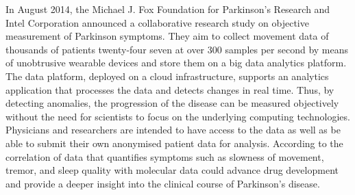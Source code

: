 In August 2014, the Michael J. Fox Foundation for Parkinson’s Research and Intel Corporation \cite{Intel_2013} announced a collaborative research study on objective measurement of Parkinson symptoms. They aim to collect movement data of thousands of patients twenty-four seven at over 300 samples per second by means of unobtrusive wearable devices and store them on a big data analytics platform. The data platform, deployed on a cloud infrastructure, supports an analytics application that processes the data and detects changes in real time. Thus, by detecting anomalies, the progression of the disease can be measured objectively without the need for scientists to focus on the underlying computing technologies. Physicians and researchers are intended to have access to the data as well as be able to submit their own anonymised patient data for analysis. According to \cite{Intel_2013} the correlation of data that quantifies symptoms such as slowness of movement, tremor, and sleep quality with molecular data could advance drug development and provide a deeper insight into the clinical course of Parkinson's disease.



